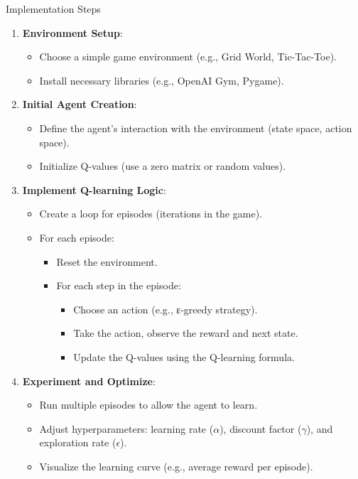 \documentclass[aspectratio=169]{beamer}
\begin{document}
\begin{frame}{Implementation Steps}
    \begin{enumerate}
        \item \textbf{Environment Setup}:
        \begin{itemize}
            \item Choose a simple game environment (e.g., Grid World, Tic-Tac-Toe).
            \item Install necessary libraries (e.g., OpenAI Gym, Pygame).
        \end{itemize}

        \item \textbf{Initial Agent Creation}:
        \begin{itemize}
            \item Define the agent’s interaction with the environment (state space, action space).
            \item Initialize Q-values (use a zero matrix or random values).
        \end{itemize}

        \item \textbf{Implement Q-learning Logic}:
        \begin{itemize}
            \item Create a loop for episodes (iterations in the game).
            \item For each episode:
            \begin{itemize}
                \item Reset the environment.
                \item For each step in the episode:
                \begin{itemize}
                    \item Choose an action (e.g., ε-greedy strategy).
                    \item Take the action, observe the reward and next state.
                    \item Update the Q-values using the Q-learning formula.
                \end{itemize}
            \end{itemize}
        \end{itemize}
        
        \item \textbf{Experiment and Optimize}:
        \begin{itemize}
            \item Run multiple episodes to allow the agent to learn.
            \item Adjust hyperparameters: learning rate ($\alpha$), discount factor ($\gamma$), and exploration rate ($\epsilon$).
            \item Visualize the learning curve (e.g., average reward per episode).
        \end{itemize}
    \end{enumerate}
\end{frame}
\end{document}
